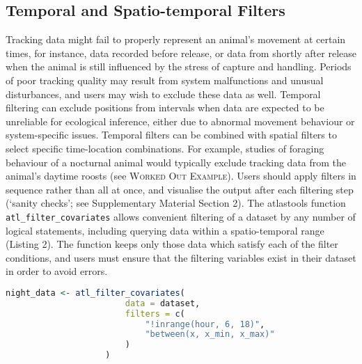 \begin{refsection}
    \subsection*{Temporal and Spatio-temporal Filters}

    Tracking data might fail to properly represent an animal’s movement at certain times, for instance, data recorded before release, or data from shortly after release when the animal is still influenced by the stress of capture and handling.
    Periods of poor tracking quality may result from system malfunctions and unusual disturbances, and users may wish to exclude these data as well.
    Temporal filtering can exclude positions from intervals when data are expected to be unreliable for ecological inference, either due to abnormal movement behaviour or system-specific issues.  
    Temporal filters can be combined with spatial filters to select specific time-location combinations. 
    For example, studies of foraging behaviour of a nocturnal animal would typically exclude tracking data from the animal's daytime roosts (see \textsc{Worked Out Example}).
    Users should apply filters in sequence rather than all at once, and visualise the output after each filtering step (`sanity checks'; see Supplementary Material Section 2).
    The atlastools function \texttt{atl\_filter\_covariates} allows convenient filtering of a dataset by any number of logical statements, including querying data within a spatio-temporal range (Listing 2).
    The function keeps only those data which satisfy each of the filter conditions, and users must ensure that the filtering variables exist in their dataset in order to avoid errors.

    \begin{lstlisting}[float, language=R, style=customR, caption = {
        Data can be filtered by a temporal or a spatio-temporal range using \texttt{atl\_filter\_covariates}. 
        Filter conditions are passed to the \texttt{filters} argument as a character vector. 
        Only rows in the data satisfying \textit{all} the conditions are retained. 
        Here, the first example shows how nighttime data can be retained using a predicate that determines whether the value of `hour' is between 6 and 18, and also within a range of X coordinates.
        The second example retains ATLAS locations calculated using $>$ 3 base stations (\texttt{NBS}), with location error (\texttt{SD}) $<$ 100, and data between an arbitrary day 5 and day 8.
        }]
    night_data <- atl_filter_covariates(
                        data = dataset,
                        filters = c(
                            "!inrange(hour, 6, 18)",
                            "between(x, x_min, x_max)"
                        )
                    )


\end{lstlisting}
\end{refsection}
